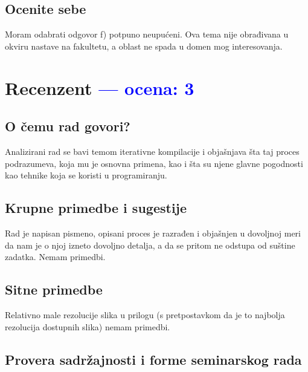 \documentclass[a4paper]{report}
\newcommand{\odgovor}[1]{\textcolor{blue}{#1}}
\begin{document}
\section{Ocenite sebe}

Moram odabrati odgovor f) potpuno neupućeni. Ova tema nije obrađivana u okviru nastave na fakultetu, a oblast ne spada u domen mog interesovanja.


\chapter{Recenzent \odgovor{--- ocena: 3} }


\section{O čemu rad govori?}
Analizirani rad se bavi temom iterativne kompilacije i objašnjava šta taj proces podrazumeva, koja mu je osnovna primena, kao i šta su njene glavne pogodnosti kao tehnike koja se koristi u programiranju. 

\section{Krupne primedbe i sugestije}
Rad je napisan pismeno, opisani proces je razrađen i objašnjen u dovoljnoj meri da nam je o njoj izneto dovoljno detalja, a da se pritom ne odstupa od suštine zadatka. Nemam primedbi.

\section{Sitne primedbe}
Relativno male rezolucije slika u prilogu (s pretpostavkom da je to najbolja rezolucija dostupnih slika) nemam primedbi.

\section{Provera sadržajnosti i forme seminarskog rada}
\end{document}
